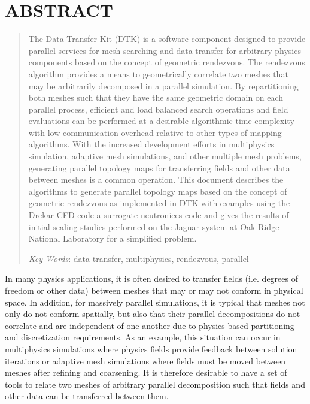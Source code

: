 \documentclass{mc2013}
\begin{document}
\section*{ABSTRACT} 
\begin{quote}
\begin{small}
The Data Transfer Kit (DTK) is a software component designed to
provide parallel services for mesh searching and data transfer for
arbitrary physics components based on the concept of geometric
rendezvous. The rendezvous algorithm provides a means to geometrically
correlate two meshes that may be arbitrarily decomposed in a parallel
simulation. By repartitioning both meshes such that they have the same
geometric domain on each parallel process, efficient and load balanced
search operations and field evaluations can be performed at a
desirable algorithmic time complexity with low communication overhead
relative to other types of mapping algorithms. With the increased
development efforts in multiphysics simulation, adaptive mesh
simulations, and other multiple mesh problems, generating parallel
topology maps for transferring fields and other data between meshes is
a common operation. This document describes the algorithms to generate
parallel topology maps based on the concept of geometric rendezvous as
implemented in DTK with examples using the Drekar CFD code a surrogate
neutronices code and gives the results of initial scaling studies
performed on the Jaguar system at Oak Ridge National Laboratory for a
simplified problem.


\emph{Key Words}: data transfer, multiphysics, rendezvous, parallel
\end{small} 
\end{quote}

\setlength{\baselineskip}{14pt}
\normalsize

\label{sec:intro}

In many physics applications, it is often desired to transfer fields
(i.e. degrees of freedom or other data) between meshes that may or may
not conform in physical space. In addition, for massively parallel
simulations, it is typical that meshes not only do not conform
spatially, but also that their parallel decompositions do not
correlate and are independent of one another due to physics-based
partitioning and discretization requirements. As an example, this
situation can occur in multiphysics simulations where physics fields
provide feedback between solution iterations or adaptive mesh
simulations where fields must be moved between meshes after refining
and coarsening. It is therefore desirable to have a set of tools to
relate two meshes of arbitrary parallel decomposition such that fields
and other data can be transferred between them.
\end{document}
